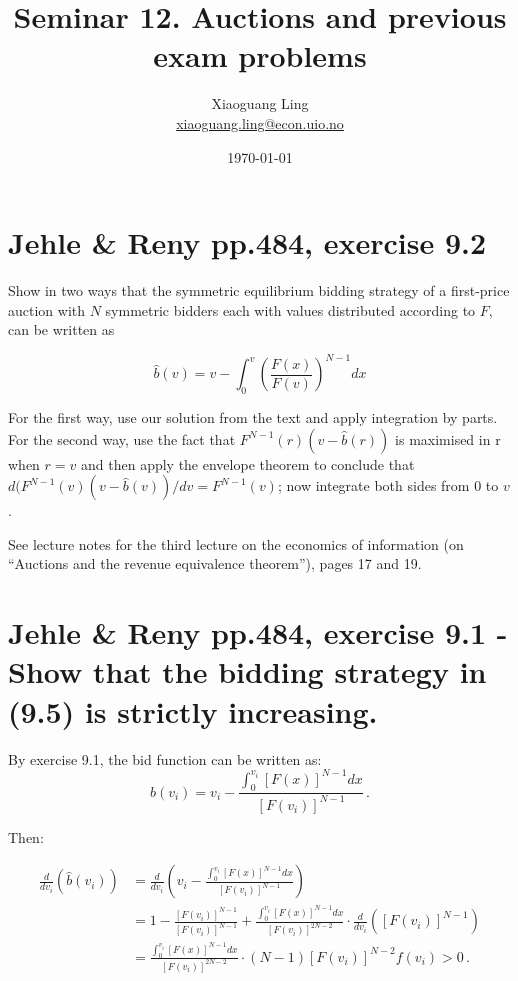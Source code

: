 \documentclass{article}
\title{Seminar 12. Auctions and previous exam problems}
\author{Xiaoguang Ling \\  \href{xiaoguang.ling@econ.uio.no}{xiaoguang.ling@econ.uio.no}}
\date{\today}
\begin{document}
\maketitle

\section{Jehle \& Reny pp.484, exercise 9.2}

Show in two ways that the symmetric equilibrium bidding strategy of a first-price auction with $N$
symmetric bidders each with values distributed according to $F$, can be written as


$$\hat{b}(v) = v -\int_{0}^{v} \left(\frac{F(x)}{F(v)}\right)^{N-1} dx$$

For the first way, use our solution from the text and apply integration by parts. For the second
way, use the fact that $F^{N-1}(r)(v - \hat{b}(r))$ is maximised in r when $r = v$ and then apply the envelope
theorem to conclude that $d(F^{N-1}(v)(v - \hat{b}(v))/dv = F^{N-1}(v)$; now integrate both sides from $0$ to $v$.

\bigskip

See lecture notes for the third lecture on the economics of information (on ``Auctions and the revenue equivalence theorem''), pages 17 and 19.


\section{Jehle \& Reny pp.484, exercise 9.1 - Show that the bidding strategy in (9.5) is strictly increasing.}

By exercise 9.1, the bid function can be written as:$$\hat{b}(v_i) = v_i - \frac{\int_0^{v_i}[F(x)]^{N-1} dx}{[F(v_i)]^{N-1}} \, .$$

Then:

\begin{align*}
  \frac{d}{dv_i}\left( \hat{b}(v_i) \right) &= \frac{d}{dv_i}\left( v_i - \frac{\int_0^{v_i}[F(x)]^{N-1} dx}{[F(v_i)]^{N-1}} \right) \\
  &= 1 - \frac{[F(v_i)]^{N-1}}{[F(v_i)]^{N-1}} + \frac{\int_0^{v_i}[F(x)]^{N-1} dx }{[F(v_i)]^{2N-2}} \cdot \frac{d}{dv_i}\left( [F(v_i)]^{N-1} \right) \\
  &= \frac{\int_0^{v_i}[F(x)]^{N-1} dx }{[F(v_i)]^{2N-2}} \cdot (N-1) [F(v_i)]^{N-2} f(v_i) > 0 \, .
\end{align*}
\end{document}
